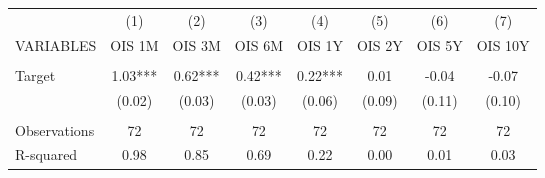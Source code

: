 \begin{tabular}{lccccccc} \hline
 & (1) & (2) & (3) & (4) & (5) & (6) & (7) \\
VARIABLES & OIS 1M & OIS 3M & OIS 6M & OIS 1Y & OIS 2Y & OIS 5Y & OIS 10Y \\ \hline
 &  &  &  &  &  &  &  \\
Target & 1.03*** & 0.62*** & 0.42*** & 0.22*** & 0.01 & -0.04 & -0.07 \\
 & (0.02) & (0.03) & (0.03) & (0.06) & (0.09) & (0.11) & (0.10) \\
 &  &  &  &  &  &  &  \\
Observations & 72 & 72 & 72 & 72 & 72 & 72 & 72 \\
 R-squared & 0.98 & 0.85 & 0.69 & 0.22 & 0.00 & 0.01 & 0.03 \\ \hline
\end{tabular}
